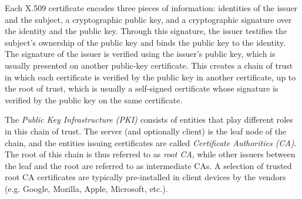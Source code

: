 \documentclass[letterpaper,12pt,titlepage,oneside,final]{book}
\begin{document}
Each X.509 certificate encodes three pieces of information: identities of the issuer and the subject, a cryptographic public key, and a cryptographic signature over the identity and the public key. 
Through this signature, the issuer testifies the subject's ownership of the public key and binds the public key to the identity.
The signature of the issuer is verified using the issuer's public key, which is usually presented on another public-key certificate.
This creates a chain of trust in which each certificate is verified by the public key in another certificate, up to the root of trust, which is usually a self-signed certificate whose signature is verified by the public key on the same certificate.

The \textit{Public Key Infrastructure (PKI)} consists of entities that play different roles in this chain of trust.
The server (and optionally client) is the leaf node of the chain, and the entities issuing certificates are called \textit{Certificate Authorities (CA)}.
The root of this chain is thus referred to as \textit{root CA}, while other issuers between the leaf and the root are referred to as intermediate CAs.
A selection of trusted root CA certificates are typically pre-installed in client devices by the vendors (e.g. Google, Mozilla, Apple, Microsoft, etc.).
\end{document}
